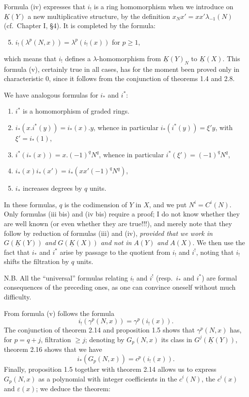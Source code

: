 %
Formula (iv) expresses that $i_!$ is a ring homomorphism when we introduce on $\underline K(Y)$ a new multiplicative structure, by the definition $x_N x'=xx'\lambda_{-1}(N)$ (cf.\ Chapter I, \S 4). It is completed by the formula:
\begin{enumerate}[label=(\roman*)]
\setcounter{enumi}{4}
\item $i_!(\lambda^p(N,x))=\lambda^p(i_!(x))$ for $p\geq1$,
\end{enumerate}
which means that $i_!$ defines a $\lambda$-homomorphism from $\underline K(Y)_N$ to $\underline K(X)$. This formula (v), certainly true in all cases, has for the moment been proved only in characteristic $0$, since it follows from the conjunction of theorems 1.4 and 2.8.

We have analogous formulas for $i_*$ and $i^*$:
\begin{enumerate}[label=(\roman* bis)]
\item $i^*$ is a homomorphism of graded rings.
\item $i_*(x.i^*(y))=i_*(x).y$, whence in particular $i_*(i^*(y))=\xi' y$, with $\xi'=i_*(1)$,
\item $i^*(i_*(x))=x.(-1)^q N^q$, whence in particular $i^*(\xi')=(-1)^q N^q$,
\item $i_*(x)i_*(x')=i_*(xx'(-1)^q N^q)$,
\item $i_*$ increases degrees by $q$ units.
\end{enumerate}

In these formulas, $q$ is the codimension of $Y$ in $X$, and we put $N^i=C^i(N)$. Only formulas (iii bis) and (iv bis) require a proof; I do not know whether they are well known (or even whether they are true!!!), and merely note that they follow by reduction of formulas (iii) and (iv), \emph{provided that we work in} $G(\underline K(Y))$ \emph{and} $G(\underline K(X))$ \emph{and not in} $A(Y)$ \emph{and} $A(X)$. We then use the fact that $i_*$ and $i^*$ arise by passage to the quotient from $i_!$ and $i^!$, noting that $i_!$ shifts the filtration by $q$ units.

%
N.B. All the ``universal'' formulas relating $i_!$ and $i^!$ (resp.\ $i_*$ and $i^*$) are formal consequences of the preceding ones, as one can convince oneself without much difficulty.

From formula (v) follows the formula
\[
 i_!(\gamma^p(N,x))=\gamma^p(i_!(x)).
\]
The conjunction of theorem 2.14 and proposition 1.5 shows that $\gamma^p(N,x)$ has, for $p=q+j$, filtration $\geq j$; denoting by $G_p(N,x)$ its class in $G^j(\underline K(Y))$, theorem 2.16 shows that we have
\[
 i_*(G_p(N,x))=c^p(i_!(x)).
\]
Finally, proposition 1.5 together with theorem 2.14 allows us to express $G_p(N,x)$ as a polynomial with integer coefficients in the $c^i(N)$, the $c^i(x)$ and $\varepsilon(x)$; we deduce the theorem:

